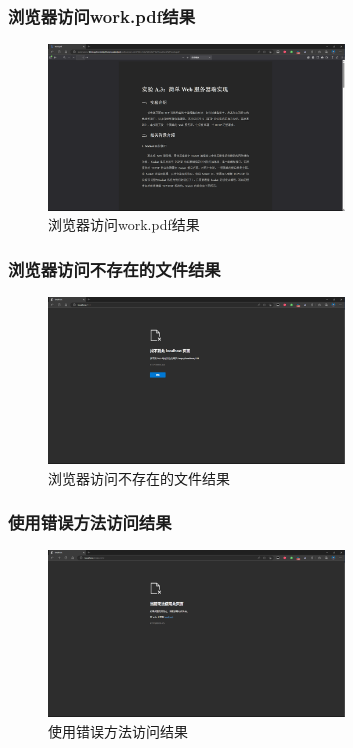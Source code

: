 \documentclass[UTF8,12pt]{article}
\begin{document}
\newpage

\subsubsection{浏览器访问work.pdf结果}
\begin{figure}[htbp]
    \centering
    \includegraphics[width=0.7\textwidth]{img/8.png}
    \caption{浏览器访问work.pdf结果}
\end{figure}

\subsubsection{浏览器访问不存在的文件结果}
\begin{figure}[htbp]
    \centering
    \includegraphics[width=0.7\textwidth]{img/9.png}
    \caption{浏览器访问不存在的文件结果}
\end{figure}

\newpage

\subsubsection{使用错误方法访问结果}
\begin{figure}[htbp]
    \centering
    \includegraphics[width=0.7\textwidth]{img/10.png}
    \caption{使用错误方法访问结果}
\end{figure}
\end{document}
